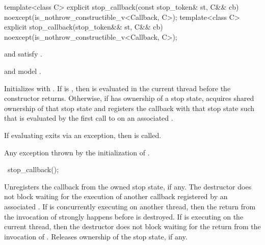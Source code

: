 %
\begin{itemdecl}
template<class C>
explicit stop_callback(const stop_token& st, C&& cb)
  noexcept(is_nothrow_constructible_v<Callback, C>);
template<class C>
explicit stop_callback(stop_token&& st, C&& cb)
  noexcept(is_nothrow_constructible_v<Callback, C>);
\end{itemdecl}
\begin{itemdescr}
\pnum
\constraints
{} and  satisfy .

\pnum
\expects
{} and  model .

\pnum
\effects
Initializes  with .
If  is , then
is evaluated in the current thread before the constructor returns.
Otherwise, if  has ownership of a stop state,
acquires shared ownership of that stop state and registers
the callback with that stop state
such that 
is evaluated by the first call to 
on an associated .

\pnum
\remarks
If evaluating
exits via an exception,
then  is called.

\pnum
\throws
Any exception thrown by the initialization of .
\end{itemdescr}

%
\begin{itemdecl}
~stop_callback();
\end{itemdecl}

\begin{itemdescr}
\pnum
\effects
Unregisters the callback from the owned stop state, if any.
The destructor does not block waiting for the execution of another callback
registered by an associated .
If  is concurrently executing on another thread,
then the return from the invocation of 
strongly happens before
 is destroyed.
If  is executing on the current thread,
then the destructor does not block waiting for
the return from the invocation of .
Releases ownership of the stop state, if any.
\end{itemdescr}



